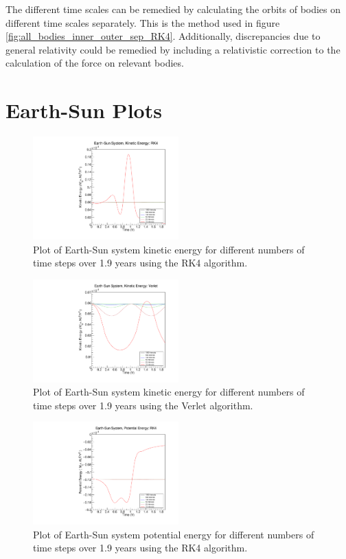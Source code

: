 \documentclass[a4paper,12pt]{report}
\begin{document}
The different time scales can be remedied by calculating the orbits of bodies on different time scales separately. This is the method used in figure \ref{fig:all_bodies_inner_outer_sep_RK4}. Additionally, discrepancies due to general relativity could be remedied by including a relativistic correction to the calculation of the force on relevant bodies.

\appendix
{}
\chapter{Earth-Sun Plots}\label{app:esplots}

\begin{figure}[H]
 \centering
   \includegraphics[width=0.5\textwidth]{ESRK4_ke.pdf}
  \caption{Plot of Earth-Sun system kinetic energy for different numbers of time steps over 1.9 years using the RK4 algorithm.}
  \label{fig:ESRK4_ke}
 \end{figure}
 
   \begin{figure}[H]
 \centering
   \includegraphics[width=0.5\textwidth]{ESVerlet_ke.pdf}
  \caption{Plot of Earth-Sun system kinetic energy for different numbers of time steps over 1.9 years using the Verlet algorithm.}
  \label{fig:ESVerlet_ke}
 \end{figure}


\begin{figure}[H]
 \centering
   \includegraphics[width=0.5\textwidth]{ESRK4_pe.pdf}
  \caption{Plot of Earth-Sun system potential energy for different numbers of time steps over 1.9 years using the RK4 algorithm.}
  \label{fig:ESRK4_pe}
 \end{figure}
\end{document}
